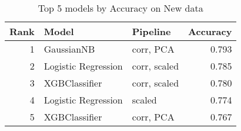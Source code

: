 \begin{table}[!htb]
\centering
\begin{tabular}{rllr}
\toprule
Rank & Model & Pipeline & Accuracy \\
\midrule
1 & GaussianNB & corr, PCA & 0.793 \\
2 & Logistic Regression & corr, scaled & 0.785 \\
3 & XGBClassifier & corr, scaled & 0.780 \\
4 & Logistic Regression & scaled & 0.774 \\
5 & XGBClassifier & corr, PCA & 0.767 \\
\bottomrule
\end{tabular}
\caption{Top 5 models by Accuracy on New data}
\label{table-top-5-accuracy-new}
\end{table}

